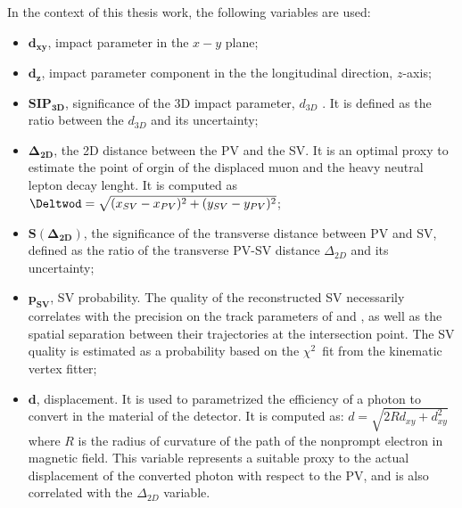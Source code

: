 In the context of this thesis work, the following variables are used:
\begin{itemize}
\item $\boldsymbol{d_{xy}}$, impact parameter in the $x-y$ plane;
\item $\boldsymbol{d_z}$, impact parameter component in the the
  longitudinal direction, $z$-axis;
\item $\boldsymbol{SIP_{3D}}$, significance of the 3D impact parameter, $d_{3D}$
 . It is defined as the ratio between the $d_{3D}$ and its
  uncertainty; 
\item $\boldsymbol{\Delta_{2D}}$, the 2D distance between the PV and
  the SV. It is an optimal proxy to estimate the point of orgin of the
displaced muon and the heavy neutral lepton decay lenght. It is
computed as $\Deltwod = \sqrt{(x_{SV}-x_{PV})^{2} + (y_{SV}-y_{PV})^{2}}$;
\item $\boldsymbol{ S(\Delta_{2D})}$, the significance of the transverse distance
  between PV and SV, defined as the ratio of the transverse PV-SV
  distance $\Delta_{2D}$ and its uncertainty;
\item $\boldsymbol{ p_{SV}}$, SV probability. The quality of the reconstructed SV
  necessarily correlates with the precision on the track parameters of
  \ltwo and \lthree, as well as the spatial separation between their
  trajectories at the intersection point. The SV quality is estimated as a probability based on the
$\chi^2$~fit from the kinematic vertex fitter;
\item $\boldsymbol{d}$, displacement. It is used to parametrized the
  efficiency of a photon to convert in the material of the
  detector. It is computed as: $d = \sqrt{2R d_{xy}+d_{xy}^2}$ where $R$ is the radius of curvature of
  the path of the nonprompt electron in magnetic field. This variable represents a suitable
  proxy to the actual displacement of the converted photon with
respect to the PV, and is also correlated with the $\Delta_{2D}$ variable.
\end{itemize}


